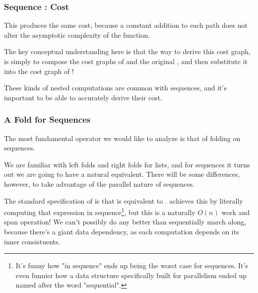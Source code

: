 \documentclass[aspectratio=169]{beamer}
\begin{document}
\begin{frame}[fragile]
  \frametitle{Sequence : Cost}

  This produces the same cost, because a constant addition to each path does
  not alter the asymptotic complexity of the function.

  \pause
  \vspace{\fill}

  The key conceptual understanding here is that the way to derive this cost
  graph, is simply to compose the cost graphs of  and the original
  , and then substitute it into the cost graph of !

  \pause
  \vspace{\fill}

  These kinds of nested computations are common with sequences, and it's
  important to be able to accurately derive their cost.
\end{frame}

\begin{frame}[fragile]
  \frametitle{A Fold for Sequences}

  The most fundamental operator we would like to analyze is that of
  folding on sequences.

  \pause
  \vspace{\fill}

  We are familiar with left folds and right folds for lists, and for
  sequences it turns out we are going to have a natural equivalent. There
  will be some differences, however, to take advantage of the parallel
  nature of sequences.

  \pause
  \vspace{\fill}

  The standard specification of  is that 
  is equivalent to . 
  achieves this by literally computing that expression in sequence\footnote{It's funny how "in sequence" ends up being the worst case
  for sequences. It's even funnier how a data structure specifically built for
  parallelism ended up named after the word "sequential".},
  but this is a naturally $O(n)$ work and span operation! We can't possibly
  do any better than sequentially march along, because there's a giant data
  dependency, as each computation depends on its inner consistuents.
\end{frame}
\end{document}
